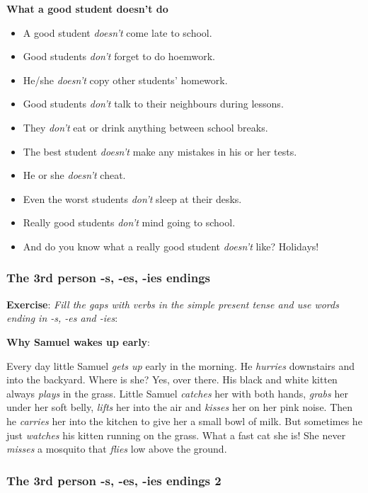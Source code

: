 \textbf{What a good student doesn't do}

\begin{itemize}

\item A good student \textit{doesn't} come late to school.
\item Good students \textit{don't} forget to do hoemwork.
\item He/she \textit{doesn't} copy other students' homework.
\item Good students \textit{don't} talk to their neighbours during lessons.
\item They \textit{don't} eat or drink anything between school breaks.
\item The best student \textit{doesn't} make any mistakes in his or her tests.
\item He or she \textit{doesn't} cheat.
\item Even the worst students \textit{don't} sleep at their desks.
\item Really good students \textit{don't} mind going to school.
\item And do you know what a really good student \textit{doesn't} like? Holidays!
\end{itemize}

\subsubsection{The 3rd person -s, -es, -ies endings}

\textbf{Exercise}: \textit{Fill the gaps with verbs in the simple present tense and use words ending in -s, -es and -ies}:

\textbf{Why Samuel wakes up early}:

Every day little Samuel \textit{gets up} early in the morning. He \textit{hurries} downstairs and into the backyard. Where is she? Yes, over there. His black and white kitten always \textit{plays} in the grass. Little Samuel \textit{catches} her with both hands, \textit{grabs} her under her soft belly, \textit{lifts} her into the air and \textit{kisses} her on her pink noise. Then he \textit{carries} her into the kitchen to give her a small bowl of milk. But sometimes he just \textit{watches} his kitten
running on the grass. What a fast cat she is! She never \textit{misses} a mosquito that \textit{flies} low above the ground.

\subsubsection{The 3rd person -s, -es, -ies endings 2}

